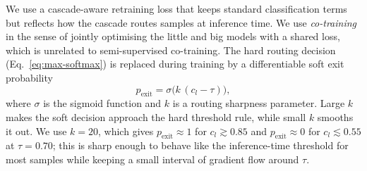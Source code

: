 \documentclass[conference]{IEEEtran}
\begin{document}
We use a cascade-aware retraining loss that keeps standard classification
terms but reflects how the cascade routes samples at inference time. We use
\emph{co-training} in the sense of jointly optimising the little and big
models with a shared loss, which is unrelated to semi-supervised
co-training.
The hard routing decision (Eq.~\ref{eq:max-softmax}) is replaced during
training by a differentiable soft exit probability
\begin{equation}
p_{\mathrm{exit}} = \sigma\bigl(k\,(c_l-\tau)\bigr),
\label{eq:soft-exit}
\end{equation}
where $\sigma$ is the sigmoid function and $k$ is a routing sharpness
parameter. Large $k$ makes the soft decision approach the hard threshold
rule, while small $k$ smooths it out. We use $k=20$, which gives
$p_{\mathrm{exit}}\approx 1$ for $c_l\gtrsim 0.85$ and $p_{\mathrm{exit}}
\approx 0$ for $c_l\lesssim 0.55$ at $\tau=0.70$; this is sharp enough to
behave like the inference-time threshold for most samples while keeping a
small interval of gradient flow around $\tau$.
\end{document}

